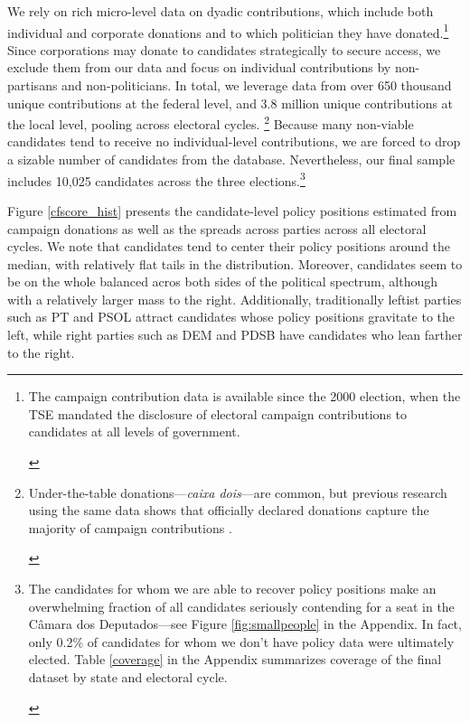 \documentclass[12pt,english]{article}
\newcommand{\note}[1]{\footnote{ \begin{doublespace}#1  \end{doublespace}}}
\numberwithin{equation}{section}
\theoremstyle{plain}
\theoremstyle{remark}
\theoremstyle{plain}
\begin{document}
We rely on rich micro-level data on dyadic contributions, which include both individual and corporate donations and to which politician they have donated.\note{\normalsize The campaign contribution data is available since the 2000 election, when the TSE mandated the disclosure of electoral campaign contributions to candidates at all levels of government.%
}  Since corporations may donate to candidates strategically to secure access, we exclude them from our data and focus on individual contributions by non-partisans and non-politicians. In total, we leverage data from over 650 thousand unique contributions at the federal level, and 3.8 million unique contributions at the local level, pooling across electoral cycles.%
\note{\normalsize Under-the-table donations---\emph{caixa dois}---are common, but previous research using the same data shows that officially declared donations capture the majority of campaign contributions \cite{BoasHidalgoRichardson2014}.} Because many non-viable candidates tend to receive no individual-level contributions, we are forced to drop a sizable number of candidates from the database. Nevertheless, our final sample includes %
10,025 candidates across the three elections.\note{\normalsize The candidates for whom we are able to recover policy positions make an overwhelming fraction of all candidates seriously contending for a seat in the  C\^{a}mara dos Deputados---see Figure \ref{fig:smallpeople} in the Appendix. In fact, only 0.2\% of candidates for whom we don't have policy data were ultimately elected. Table \ref{coverage} in the Appendix summarizes coverage of the final dataset by state and electoral cycle.}

Figure \ref{cfscore_hist} presents the candidate-level policy positions estimated from campaign donations as well as the spreads across parties across all electoral cycles. We note that candidates tend to center their policy positions around the median, with relatively flat tails in the distribution. Moreover, candidates seem to be on the whole balanced acros both sides of the political spectrum, although with a relatively larger mass to the right. Additionally, traditionally leftist parties such as PT and PSOL attract candidates whose policy positions gravitate to the left, while right parties such as DEM and PDSB have candidates who lean farther to the right.
\end{document}
